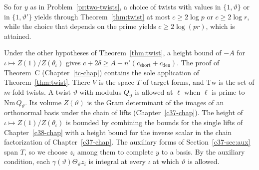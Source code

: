 \documentclass[reqno]{amsart}
\newcounter{chap}
\theoremstyle{definition}
\theoremstyle{plain}
\theoremstyle{remark}
\newcommand{\cshort}{c_{\mathrm{short}}}
\newcommand{\cden}{c_{\mathrm{den}}}
\begin{document}
So for \(y\) as in Problem~\ref{pr:two-twists}, a choice of twists with values in \(\{1, \vartheta\}\) or in \(\{1, \vartheta'\}\) yields through Theorem~\ref{thm:twist} at most \(c \ge 2\log p\) or \(c \ge 2\log r\), while the choice that depends on the prime yields \(c \ge 2\log(pr)\), which is attained.

Under the other hypotheses of Theorem~\ref{thm:twist}, a height bound of \(-A\) for \(\iota\mapsto Z(1)/Z(\theta_\iota)\) gives \(c+2\delta\ge A-n'(\cshort+\cden)\).  The proof of Theorem~C (Chapter~\ref{tc-chap}) contains the sole application of Theorem~\ref{thm:twist}.  There \(V\) is the space \(T\) of target forms, and \(\mathrm{Tw}\) is the set of \(m\)-fold twists.  A twist \(\vartheta\) with modulus \(Q_\vartheta\) is allowed at \(\ell\) when \(\ell\) is prime to \(\mathrm{Nm}\,Q_\vartheta\).  Its volume \(Z(\vartheta)\) is the Gram determinant of the images of an orthonormal basis under the chain of lifts (Chapter~\ref{c37-chap}).  The height of \(\iota\mapsto Z(1)/Z(\theta_\iota)\) is bounded by combining the bounds for the single lifts of Chapter~\ref{c38-chap} with a height bound for the inverse scalar in the chain factorization of Chapter~\ref{c37-chap}.  The auxiliary forms of Section~\ref{c37-sec:aux} span \(T\), so we choose \(z_i\) among them to complete \(y\) to a basis.  By the auxiliary condition, each \(\gamma(\vartheta)\Theta_\vartheta z_i\) is integral at every \(\iota\) at which \(\vartheta\) is allowed.
\end{document}
